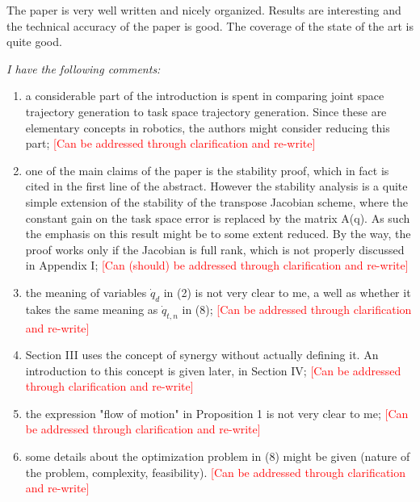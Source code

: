 \documentclass[10pt,stdletter,dateno]{newlfm}
\begin{document}
\begin{newlfm}
The paper is very well written and nicely organized. Results are
interesting and the technical accuracy of the paper is good. The
coverage of the state of the art is quite good.

\textit{I have the following comments:}
\begin{enumerate}
\item a considerable part of the introduction is spent in comparing joint
space trajectory generation to task space trajectory generation. Since
these are elementary concepts in robotics, the authors might consider
reducing this part; \textcolor{red}{[Can be addressed through clarification and re-write]}

\item one of the main claims of the paper is the stability proof, which in
fact is cited in the first line of the abstract. However the stability
analysis is a quite simple extension of the stability of the transpose
Jacobian scheme, where the constant gain on the task space error is
replaced by the matrix A(q). As such the emphasis on this result might
be to some extent reduced. By the way, the proof works only if the
Jacobian is full rank, which is not properly discussed in Appendix I; \textcolor{red}{[Can (should) be addressed through clarification and re-write]}

\item the meaning of variables $\dot{q}_d$ in (2) is not very clear to me, a
well as whether it takes the same meaning as $\dot{q}_{t,n}$ in (8); \textcolor{red}{[Can be addressed through clarification and re-write]}

\item Section III uses the concept of synergy without actually defining it.
An introduction to this concept is given later, in Section IV; \textcolor{red}{[Can be addressed through clarification and re-write]}

\item the expression "flow of motion" in Proposition 1 is not very clear to
me; \textcolor{red}{[Can be addressed through clarification and re-write]}

\item some details about the optimization problem in (8) might be given
(nature of the problem, complexity, feasibility). \textcolor{red}{[Can be addressed through clarification and re-write]}
\end{enumerate}




\end{newlfm}
\end{document}
